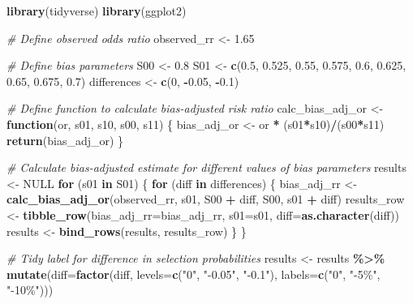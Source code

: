 \documentclass[
]{book}
\newenvironment{Shaded}{\begin{snugshade}}{\end{snugshade}}
\newcommand{\AttributeTok}[1]{\textcolor[rgb]{0.13,0.29,0.53}{#1}}
\newcommand{\CommentTok}[1]{\textcolor[rgb]{0.56,0.35,0.01}{\textit{#1}}}
\newcommand{\ConstantTok}[1]{\textcolor[rgb]{0.56,0.35,0.01}{#1}}
\newcommand{\ControlFlowTok}[1]{\textcolor[rgb]{0.13,0.29,0.53}{\textbf{#1}}}
\newcommand{\DecValTok}[1]{\textcolor[rgb]{0.00,0.00,0.81}{#1}}
\newcommand{\FloatTok}[1]{\textcolor[rgb]{0.00,0.00,0.81}{#1}}
\newcommand{\FunctionTok}[1]{\textcolor[rgb]{0.13,0.29,0.53}{\textbf{#1}}}
\newcommand{\NormalTok}[1]{#1}
\newcommand{\OtherTok}[1]{\textcolor[rgb]{0.56,0.35,0.01}{#1}}
\newcommand{\SpecialCharTok}[1]{\textcolor[rgb]{0.81,0.36,0.00}{\textbf{#1}}}
\newcommand{\StringTok}[1]{\textcolor[rgb]{0.31,0.60,0.02}{#1}}
\begin{document}
\begin{Shaded}
\begin{Highlighting}[]
\FunctionTok{library}\NormalTok{(tidyverse)}
\FunctionTok{library}\NormalTok{(ggplot2)}

\CommentTok{\# Define observed odds ratio}
\NormalTok{observed\_rr }\OtherTok{\textless{}{-}} \FloatTok{1.65}

\CommentTok{\# Define bias parameters}
\NormalTok{S00 }\OtherTok{\textless{}{-}} \FloatTok{0.8}
\NormalTok{S01 }\OtherTok{\textless{}{-}} \FunctionTok{c}\NormalTok{(}\FloatTok{0.5}\NormalTok{, }\FloatTok{0.525}\NormalTok{, }\FloatTok{0.55}\NormalTok{, }\FloatTok{0.575}\NormalTok{, }\FloatTok{0.6}\NormalTok{, }\FloatTok{0.625}\NormalTok{, }\FloatTok{0.65}\NormalTok{, }\FloatTok{0.675}\NormalTok{, }\FloatTok{0.7}\NormalTok{)}
\NormalTok{differences }\OtherTok{\textless{}{-}} \FunctionTok{c}\NormalTok{(}\DecValTok{0}\NormalTok{, }\SpecialCharTok{{-}}\FloatTok{0.05}\NormalTok{, }\SpecialCharTok{{-}}\FloatTok{0.1}\NormalTok{) }

\CommentTok{\# Define function to calculate bias{-}adjusted risk ratio}
\NormalTok{calc\_bias\_adj\_or }\OtherTok{\textless{}{-}} \ControlFlowTok{function}\NormalTok{(or, s01, s10, s00, s11) \{}
\NormalTok{  bias\_adj\_or }\OtherTok{\textless{}{-}}\NormalTok{ or }\SpecialCharTok{*}\NormalTok{ (s01}\SpecialCharTok{*}\NormalTok{s10)}\SpecialCharTok{/}\NormalTok{(s00}\SpecialCharTok{*}\NormalTok{s11)}
  \FunctionTok{return}\NormalTok{(bias\_adj\_or)}
\NormalTok{\}}

\CommentTok{\# Calculate bias{-}adjusted estimate for different values of bias parameters}
\NormalTok{results }\OtherTok{\textless{}{-}} \ConstantTok{NULL}
\ControlFlowTok{for}\NormalTok{ (s01 }\ControlFlowTok{in}\NormalTok{ S01) \{}
  \ControlFlowTok{for}\NormalTok{ (diff }\ControlFlowTok{in}\NormalTok{ differences) \{}
\NormalTok{    bias\_adj\_rr }\OtherTok{\textless{}{-}} \FunctionTok{calc\_bias\_adj\_or}\NormalTok{(observed\_rr, s01, S00 }\SpecialCharTok{+}\NormalTok{ diff, S00, s01 }\SpecialCharTok{+}\NormalTok{ diff)}
\NormalTok{    results\_row }\OtherTok{\textless{}{-}} \FunctionTok{tibble\_row}\NormalTok{(}\AttributeTok{bias\_adj\_rr=}\NormalTok{bias\_adj\_rr, }\AttributeTok{s01=}\NormalTok{s01, }\AttributeTok{diff=}\FunctionTok{as.character}\NormalTok{(diff))}
\NormalTok{    results }\OtherTok{\textless{}{-}} \FunctionTok{bind\_rows}\NormalTok{(results, results\_row)}
\NormalTok{  \}}
\NormalTok{\}}

\CommentTok{\# Tidy label for difference in selection probabilities}
\NormalTok{results }\OtherTok{\textless{}{-}}\NormalTok{ results }\SpecialCharTok{\%\textgreater{}\%} 
  \FunctionTok{mutate}\NormalTok{(}\AttributeTok{diff=}\FunctionTok{factor}\NormalTok{(diff, }\AttributeTok{levels=}\FunctionTok{c}\NormalTok{(}\StringTok{"0"}\NormalTok{, }\StringTok{"{-}0.05"}\NormalTok{, }\StringTok{"{-}0.1"}\NormalTok{), }\AttributeTok{labels=}\FunctionTok{c}\NormalTok{(}\StringTok{"0"}\NormalTok{, }\StringTok{"{-}5\%"}\NormalTok{, }\StringTok{"{-}10\%"}\NormalTok{)))}


\end{Highlighting}
\end{Shaded}
\end{document}
